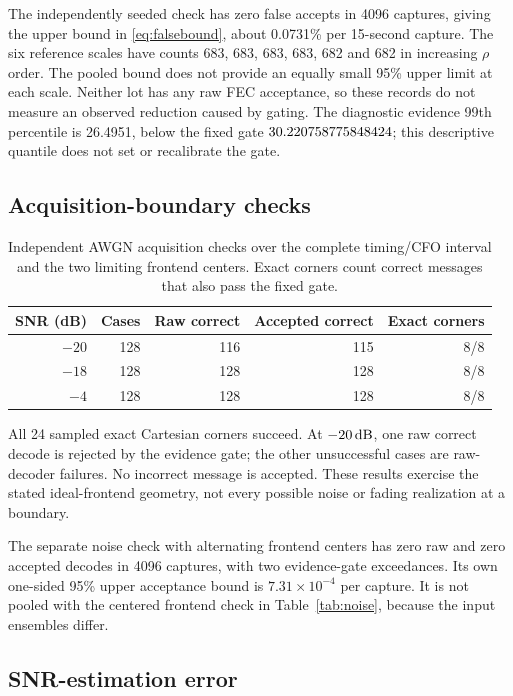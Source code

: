 The independently seeded check has zero false accepts in 4096 captures,
giving the upper bound in \eqref{eq:falsebound}, about 0.0731\% per
15-second capture. The six reference scales have counts 683, 683, 683,
683, 682 and 682 in increasing $\rho$ order. The pooled bound does not
provide an equally small 95\% upper limit at each scale. Neither lot
has any raw FEC acceptance, so these records do not measure an observed
reduction caused by gating. The diagnostic evidence 99th percentile is
26.4951, below the fixed gate $30.220758775848424$; this descriptive quantile does not
set or recalibrate the gate.

\subsection{Acquisition-boundary checks}

\begin{table}[htbp]
\centering
\begin{tabular}{@{}rrrrr@{}}
\toprule
SNR (dB) & Cases & Raw correct & Accepted correct & Exact corners \\
\midrule
$-20$ & 128 & 116 & 115 & 8/8 \\
$-18$ & 128 & 128 & 128 & 8/8 \\
$-4$ & 128 & 128 & 128 & 8/8 \\
\bottomrule
\end{tabular}
\caption{Independent AWGN acquisition checks over the complete timing/CFO
interval and the two limiting frontend centers. Exact corners count
correct messages that also pass the fixed gate.}
\label{tab:acquisition}
\end{table}

All 24 sampled exact Cartesian corners succeed. At $-20\,\mathrm{dB}$, one raw
correct decode is rejected by the evidence gate; the other unsuccessful
cases are raw-decoder failures. No incorrect message is accepted. These
results exercise the stated ideal-frontend geometry, not every possible
noise or fading realization at a boundary.

The separate noise check with alternating frontend centers has zero raw
and zero accepted decodes in 4096 captures, with two evidence-gate
exceedances. Its own one-sided 95\% upper acceptance bound is
$7.31\times10^{-4}$ per capture. It is not pooled with the centered
frontend check in Table~\ref{tab:noise}, because the input ensembles differ.

\subsection{SNR-estimation error}


